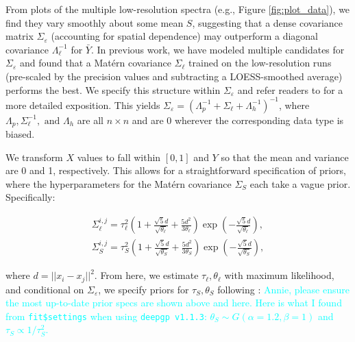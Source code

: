 \documentclass[11pt]{article}
\begin{document}
From plots of the multiple low-resolution spectra (e.g., Figure \ref{fig:plot_data}), we find they vary smoothly about some mean $S$, suggesting that a dense covariance matrix $\Sigma_\varepsilon$ (accounting for spatial dependence) may outperform a diagonal covariance $\Lambda_\ell^{-1}$ for $\bar Y$. In previous work, we have modeled multiple candidates for $\Sigma_\varepsilon$ \citep{walsh2023bayesian} and found that a Mat\'ern covariance $\Sigma_\ell$ trained on the low-resolution runs (pre-scaled by the precision values and subtracting a LOESS-smoothed average) performs the best. We specify this structure within $\Sigma_\varepsilon$ and refer readers to \cite{walsh2023bayesian} for a more detailed exposition. This yields $\Sigma_\varepsilon=\left(\Lambda_p^{-1} + \Sigma_\ell + \Lambda_h^{-1}\right)^{-1}$, where $\Lambda_p, \Sigma_\ell^{-1}, \text{ and } \Lambda_h$ are all $n\times n$ and are 0 wherever the corresponding data type is biased.

We transform $X$ values to fall within $[0,1]$ and $Y$ so that the mean and variance are 0 and 1, respectively. This allows for a straightforward specification of priors, where the hyperparameters for the Mat\'ern covariance $\Sigma_S$ each take a vague prior. Specifically:

\begin{align}
\Sigma_\ell^{i,j} = \tau_\ell^2  \left( 1 + \frac{\sqrt{5}d}{\sqrt{\theta_\ell}} + \frac{5d^2}{3\theta_\ell}\right) \exp\left(-\frac{\sqrt{5}d}{\sqrt{\theta_\ell}}\right),\\
\Sigma_S^{i,j} = \tau_S^2  \left( 1 + \frac{\sqrt{5}d}{\sqrt{\theta_S}} + \frac{5d^2}{3\theta_S}\right) \exp\left(-\frac{\sqrt{5}d}{\sqrt{\theta_S}}\right),
\end{align}

where $d=||x_i-x_j||^2$. From here, we estimate $\tau_\ell, \theta_\ell$ with maximum likelihood, and conditional on $\Sigma_\varepsilon$, we specify priors for $\tau_S, \theta_S$ following \cite{sauer2023active}: \textcolor{cyan}{Annie, please ensure the most up-to-date prior specs are shown above and here. Here is what I found from \texttt{fit\$settings} when using \texttt{deepgp v1.1.3}: $\theta_S \sim G(\alpha=1.2, \beta=1)$ and $\tau_S \propto 1/\tau_S^2$.}

\end{document}
